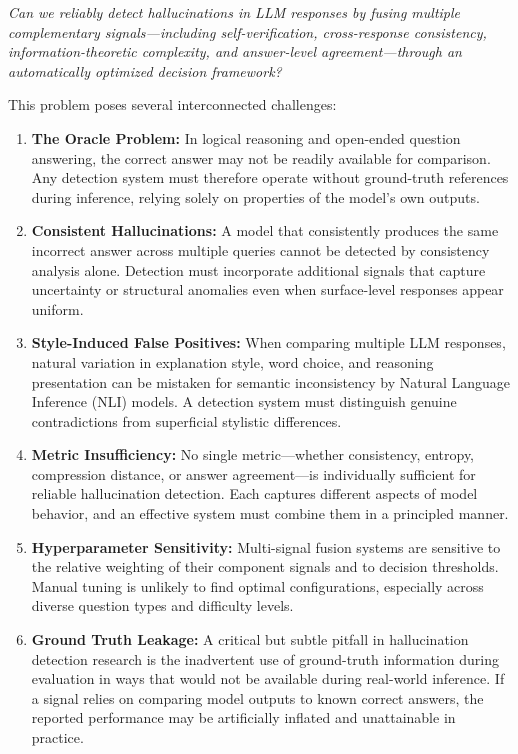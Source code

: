 \textit{Can we reliably detect hallucinations in LLM responses by fusing multiple complementary signals---including self-verification, cross-response consistency, information-theoretic complexity, and answer-level agreement---through an automatically optimized decision framework?}

This problem poses several interconnected challenges:

\begin{enumerate}
    \item \textbf{The Oracle Problem:} In logical reasoning and open-ended question answering, the correct answer may not be readily available for comparison. Any detection system must therefore operate without ground-truth references during inference, relying solely on properties of the model's own outputs.

    \item \textbf{Consistent Hallucinations:} A model that consistently produces the same incorrect answer across multiple queries cannot be detected by consistency analysis alone. Detection must incorporate additional signals that capture uncertainty or structural anomalies even when surface-level responses appear uniform.

    \item \textbf{Style-Induced False Positives:} When comparing multiple LLM responses, natural variation in explanation style, word choice, and reasoning presentation can be mistaken for semantic inconsistency by Natural Language Inference (NLI) models. A detection system must distinguish genuine contradictions from superficial stylistic differences.

    \item \textbf{Metric Insufficiency:} No single metric---whether consistency, entropy, compression distance, or answer agreement---is individually sufficient for reliable hallucination detection. Each captures different aspects of model behavior, and an effective system must combine them in a principled manner.

    \item \textbf{Hyperparameter Sensitivity:} Multi-signal fusion systems are sensitive to the relative weighting of their component signals and to decision thresholds. Manual tuning is unlikely to find optimal configurations, especially across diverse question types and difficulty levels.

    \item \textbf{Ground Truth Leakage:} A critical but subtle pitfall in hallucination detection research is the inadvertent use of ground-truth information during evaluation in ways that would not be available during real-world inference. If a signal relies on comparing model outputs to known correct answers, the reported performance may be artificially inflated and unattainable in practice.
\end{enumerate}

